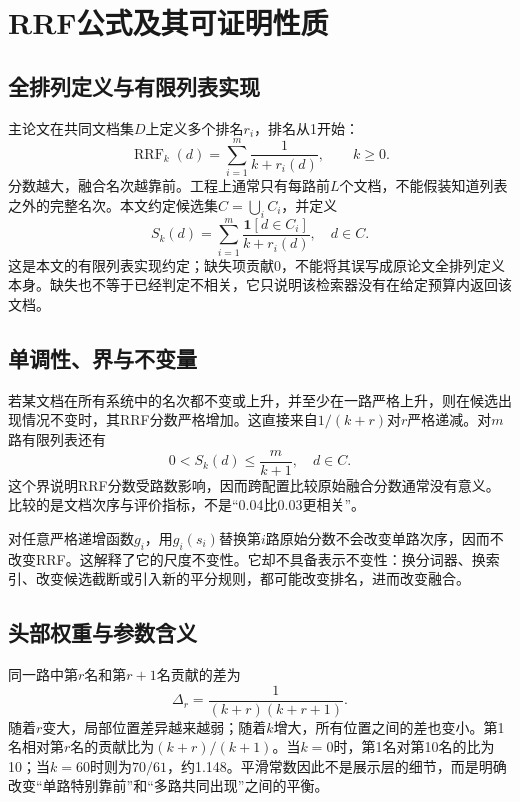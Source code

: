 \documentclass[sigconf,nonacm]{acmart}
\newcommand{\RRF}{\operatorname{RRF}}
\begin{document}
\section{RRF公式及其可证明性质}
\subsection{全排列定义与有限列表实现}
主论文在共同文档集$D$上定义多个排名$r_i$，排名从1开始：
\begin{equation}\label{eq:rrf}
 \RRF_k(d)=\sum_{i=1}^{m}\frac{1}{k+r_i(d)},\qquad k\geq0.
\end{equation}
分数越大，融合名次越靠前。工程上通常只有每路前$L$个文档，不能假装知道列表之外的完整名次。本文约定候选集$C=\bigcup_i C_i$，并定义
\begin{equation}\label{eq:truncated}
 S_k(d)=\sum_{i=1}^{m}\frac{\mathbf1[d\in C_i]}{k+r_i(d)},\quad d\in C.
\end{equation}
这是本文的有限列表实现约定；缺失项贡献0，不能将其误写成原论文全排列定义本身。缺失也不等于已经判定不相关，它只说明该检索器没有在给定预算内返回该文档。

\subsection{单调性、界与不变量}
若某文档在所有系统中的名次都不变或上升，并至少在一路严格上升，则在候选出现情况不变时，其RRF分数严格增加。这直接来自$1/(k+r)$对$r$严格递减。对$m$路有限列表还有
\begin{equation}
 0<S_k(d)\leq\frac{m}{k+1},\quad d\in C.
\end{equation}
这个界说明RRF分数受路数影响，因而跨配置比较原始融合分数通常没有意义。比较的是文档次序与评价指标，不是“0.04比0.03更相关”。

对任意严格递增函数$g_i$，用$g_i(s_i)$替换第$i$路原始分数不会改变单路次序，因而不改变RRF。这解释了它的尺度不变性。它却不具备表示不变性：换分词器、换索引、改变候选截断或引入新的平分规则，都可能改变排名，进而改变融合。

\subsection{头部权重与参数含义}
同一路中第$r$名和第$r+1$名贡献的差为
\begin{equation}
 \Delta_r=\frac{1}{(k+r)(k+r+1)}.
\end{equation}
随着$r$变大，局部位置差异越来越弱；随着$k$增大，所有位置之间的差也变小。第1名相对第$r$名的贡献比为$(k+r)/(k+1)$。当$k=0$时，第1名对第10名的比为10；当$k=60$时则为$70/61$，约1.148。平滑常数因此不是展示层的细节，而是明确改变“单路特别靠前”和“多路共同出现”之间的平衡。
\end{document}
